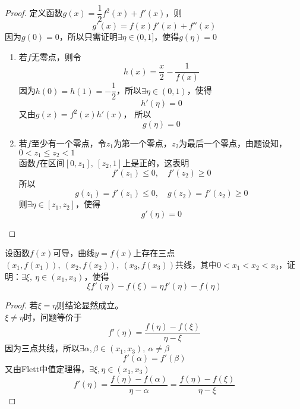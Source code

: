 \begin{proof}

    定义函数$g(x) = \dfrac{1}{2}f^2(x) + f'(x)$，则
    $$g'(x) = f(x) f'(x) + f''(x)$$
    因为$g(0) = 0$，所以只需证明$\exists \eta \in (0,1]$，使得$g(\eta) = 0$

    \begin{enumerate}

        \item 若$f$无零点，则令
            $$h(x) = \dfrac{x}{2} - \dfrac{1}{f(x)}$$
            因为$h(0) = h(1) = -\dfrac{1}{2}$，所以$\exists \eta \in (0,1)$，使得
            $$h'(\eta) = 0$$
            又由$g(x) = f^2(x) h'(x)$，
            所以
            $$g(\eta) = 0$$

        \item 
            若$f$至少有一个零点，令$z_1$为第一个零点，$z_2$为最后一个零点，由题设知，$0 < z_1 \leq z_2 < 1$\\
            函数$f$在区间$[0,z_1],\ [z_2,1]$上是正的，这表明
            $$f'(z_1) \leq 0,\quad f'(z_2) \geq 0$$
            所以
            $$g(z_1) = f'(z_1) \leq 0, \quad g(z_2) = f'(z_2) \geq 0$$
            则$\exists \eta \in [z_1,z_2]$，使得
            $$g'(\eta) = 0$$

    \end{enumerate}

\end{proof}

\begin{proposition}

    设函数$f(x)$可导，曲线$y = f(x)$上存在三点$(x_1,f(x_1)),\ (x_2,f(x_2)), \ (x_3,f(x_3))$共线，其中$0 < x_1 < x_2 < x_3$，证明：$\exists \xi,\  \eta \in (x_1,x_3)$，使得
    $$\xi f'(\eta) - f(\xi) = \eta f'(\eta) - f(\eta)$$

\end{proposition}

\begin{proof}

    若$\xi = \eta$则结论显然成立。\\
    $\xi \neq \eta$时，问题等价于
    $$ f'(\eta) = \dfrac{f(\eta) - f(\xi)}{\eta - \xi}$$
    因为三点共线，所以$\exists \alpha,\beta \in (x_1, x_3), \ \alpha \neq \beta$
    $$f'(\alpha) = f'(\beta)$$
    又由\textup{Flett}中值定理得，$\exists \xi,\eta \in (x_1,x_3)$
    $$f'(\eta) = \dfrac{f(\eta) - f(\alpha)}{\eta - \alpha} = \dfrac{f(\eta) - f(\xi)}{\eta - \xi}$$

\end{proof}


